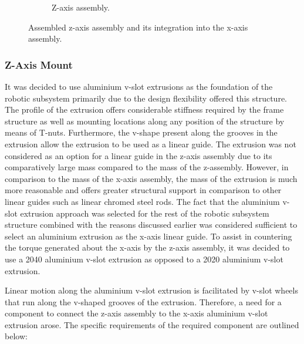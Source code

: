 \begin{figure}[!ht]
\begin{subfigure}{.39\textwidth}
		\caption{Z-axis assembly.}
		\label{fig:z-axis-assembly}
	\end{subfigure}%
	\caption{Assembled z-axis assembly and its integration into the x-axis assembly.}
	\label{fig:z-x-axis-assemblies}
\end{figure}

\subsubsection{Z-Axis Mount}

It was decided to use aluminium v-slot extrusions as the foundation of the robotic subsystem primarily due to the design flexibility offered this structure. The profile of the extrusion offers considerable stiffness required by the frame structure as well as mounting locations along any position of the structure by means of T-nuts. Furthermore, the v-shape present along the grooves in the extrusion allow the extrusion to be used as a linear guide. The extrusion was not considered as an option for a linear guide in the z-axis assembly due to its comparatively large mass compared to the mass of the z-assembly. However, in comparison to the mass of the x-axis assembly, the mass of the extrusion is much more reasonable and offers greater structural support in comparison to other linear guides such as linear chromed steel rods. The fact that the aluminium v-slot extrusion approach was selected for the rest of the robotic subsystem structure combined with the reasons discussed earlier was considered sufficient to select an aluminium extrusion as the x-axis linear guide. To assist in countering the torque generated about the x-axis by the z-axis assembly, it was decided to use a 2040 aluminium v-slot extrusion as opposed to a 2020 aluminium v-slot extrusion.

Linear motion along the aluminium v-slot extrusion is facilitated by v-slot wheels that run along the v-shaped grooves of the extrusion. Therefore, a need for a component to connect the z-axis assembly to the x-axis aluminium v-slot extrusion arose. The specific requirements of the required component are outlined below:

